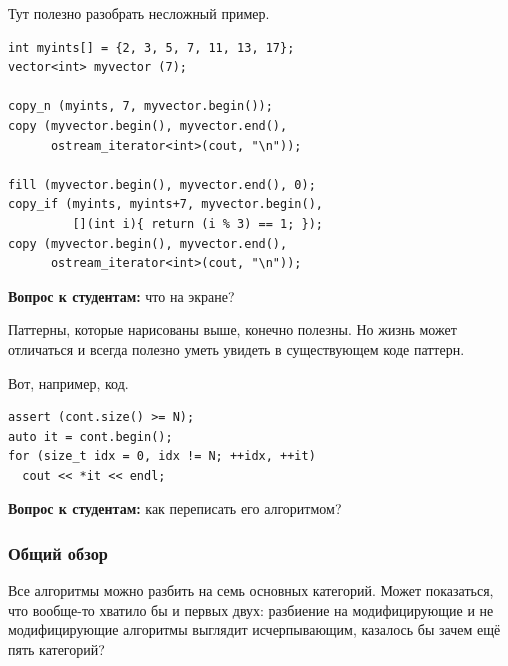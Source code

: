 \documentclass[a4paper,12pt,oneside]{article}
\newif\ifanswers
\begin{document}
Тут полезно разобрать несложный пример.

\begin{lstlisting}
int myints[] = {2, 3, 5, 7, 11, 13, 17}; 
vector<int> myvector (7);

copy_n (myints, 7, myvector.begin());
copy (myvector.begin(), myvector.end(), 
      ostream_iterator<int>(cout, "\n"));

fill (myvector.begin(), myvector.end(), 0);
copy_if (myints, myints+7, myvector.begin(), 
         [](int i){ return (i % 3) == 1; });
copy (myvector.begin(), myvector.end(), 
      ostream_iterator<int>(cout, "\n"));
\end{lstlisting}

\textbf{Вопрос к студентам:} что на экране?

\ifanswers
Сначала будут выведены через перевод строки все числа 2, 3, 5, 7, 11, 13, 17, а потом, тоже через перевод строки, будут выведены числа 7, 13, 0, 0, 0, 0, 0, поскольку только эти два числа из перечисленных дают 1 в остатке от деления на 3.
\fi

Паттерны, которые нарисованы выше, конечно полезны. Но жизнь может отличаться и всегда полезно уметь увидеть в существующем коде паттерн.

Вот, например, код.

\begin{lstlisting}
assert (cont.size() >= N);
auto it = cont.begin();
for (size_t idx = 0, idx != N; ++idx, ++it)
  cout << *it << endl;
\end{lstlisting}

\textbf{Вопрос к студентам:} как переписать его алгоритмом?

\ifanswers
Это очевидный случай \lstinline!copy_n! и алгоритм будет соответствующий (здесь \lstinline!tp_! это тип элемента в контейнере).

\begin{lstlisting}
copy_n (cont.begin(), N, ostream_iterator<tp_>(cout, "\n"));
\end{lstlisting}
\fi

\subsubsection{Общий обзор}

Все алгоритмы можно разбить на семь основных категорий. Может показаться, что вообще-то хватило бы и первых двух: разбиение на модифицирующие и не модифицирующие алгоритмы выглядит исчерпывающим, казалось бы зачем ещё пять категорий?
\end{document}
